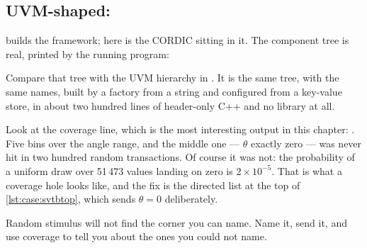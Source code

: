 \subsection{UVM-shaped: }

\Refsimulationbook builds the framework; here is the CORDIC sitting in it.
The component tree is real, printed by the running program:


Compare that tree with the UVM hierarchy in . It is the same
tree, with the same names, built by a factory from a string and configured
from a key-value store, in about two hundred lines of header-only C++ and no
library at all.

Look at the coverage line, which is the most interesting output in this
chapter: \code{[62 47 0 46 45]}. Five bins over the angle range, and the
middle one --- $\theta$ exactly zero --- was never hit in two hundred random
transactions. Of course it was not: the probability of a uniform draw over
51\,473 values landing on zero is $2^{-5}$. That is what a coverage
hole looks like, and the fix is the directed list at the top of
\cref{lst:case:svtbtop}, which sends $\theta = 0$ deliberately.

\begin{ruleofthumb}
Random stimulus will not find the corner you can name. Name it, send it, and
use coverage to tell you about the ones you could not name.
\end{ruleofthumb}

\clearpage
{}

\clearpage
{}

\clearpage
{}

